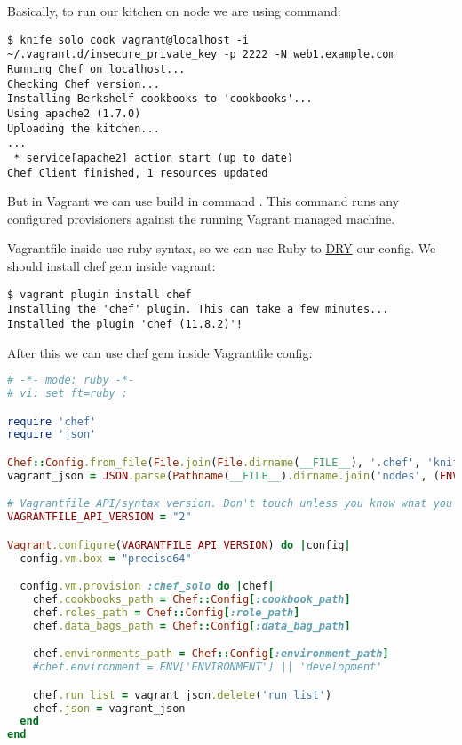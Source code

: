 Basically, to run our kitchen on node we are using  command:

\begin{lstlisting}[label=lst:my-cloud-vagrant11]
$ knife solo cook vagrant@localhost -i ~/.vagrant.d/insecure_private_key -p 2222 -N web1.example.com
Running Chef on localhost...
Checking Chef version...
Installing Berkshelf cookbooks to 'cookbooks'...
Using apache2 (1.7.0)
Uploading the kitchen...
...
 * service[apache2] action start (up to date)
Chef Client finished, 1 resources updated
\end{lstlisting}

But in Vagrant we can use build in command . This command runs any configured provisioners against the running Vagrant managed machine.

Vagrantfile inside use ruby syntax, so we can use Ruby to \href{http://en.wikipedia.org/wiki/Dont\_repeat\_yourself}{DRY} our config. We should install chef gem inside vagrant:

\begin{lstlisting}[label=lst:my-cloud-vagrant6]
$ vagrant plugin install chef
Installing the 'chef' plugin. This can take a few minutes...
Installed the plugin 'chef (11.8.2)'!
\end{lstlisting}

After this we can use chef gem inside Vagrantfile config:

\begin{lstlisting}[language=Ruby,label=lst:my-cloud-vagrant7,title=my-cloud/nodes/Vagrantfile]
# -*- mode: ruby -*-
# vi: set ft=ruby :

require 'chef'
require 'json'

Chef::Config.from_file(File.join(File.dirname(__FILE__), '.chef', 'knife.rb'))
vagrant_json = JSON.parse(Pathname(__FILE__).dirname.join('nodes', (ENV['NODE'] || 'web1.example.com.json')).read)

# Vagrantfile API/syntax version. Don't touch unless you know what you're doing!
VAGRANTFILE_API_VERSION = "2"

Vagrant.configure(VAGRANTFILE_API_VERSION) do |config|
  config.vm.box = "precise64"

  config.vm.provision :chef_solo do |chef|
    chef.cookbooks_path = Chef::Config[:cookbook_path]
    chef.roles_path = Chef::Config[:role_path]
    chef.data_bags_path = Chef::Config[:data_bag_path]

    chef.environments_path = Chef::Config[:environment_path]
    #chef.environment = ENV['ENVIRONMENT'] || 'development'

    chef.run_list = vagrant_json.delete('run_list')
    chef.json = vagrant_json
  end
end
\end{lstlisting}

